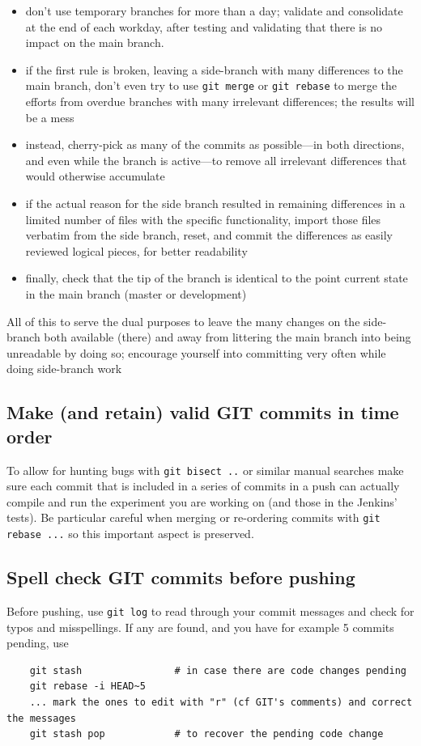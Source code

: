 \documentclass[paper=a4,fontsize=11pt]{scrartcl}
\numberwithin{equation}{section}		%
\numberwithin{figure}{section}			%
\numberwithin{table}{section}				%
\newcommand{\cmdcolor}{\color{ForestGreen}}
\newcommand{\Cmd}[1]{{\cmdcolor\texttt{#1}}}
\begin{document}
\begin{itemize}
\item don't use temporary branches for more than a day; validate and consolidate at the end of each workday, after testing and validating that there is no impact on the main branch.
\item if the first rule is broken, leaving a side-branch with many differences to the main branch, don't even try to use \Cmd{git merge} or \Cmd{git rebase} to merge the efforts from overdue branches with many irrelevant differences; the results will be a mess
\item instead, cherry-pick as many of the commits as possible---in both directions, and even while the branch is active---to remove all irrelevant differences that would otherwise accumulate
\item if the actual reason for the side branch resulted in remaining differences in a limited number of files with the specific functionality, import those files verbatim from the side branch, reset, and commit the differences as easily reviewed logical pieces, for better readability
\item finally, check that the tip of the branch is identical to the point current state in the main branch (master or development)
\end{itemize}
All of this to serve the dual purposes to leave the many changes on the side-branch both available (there) and away from littering the main branch into being unreadable
by doing so; encourage yourself into committing very often while doing side-branch work

\subsection{Make (and retain) valid GIT commits in time order}
To allow for hunting bugs with \verb|git bisect ..| or similar manual searches make sure each commit that is included in a series of commits in a push can actually compile and run the experiment you are working on (and those in the Jenkins' tests).  Be particular careful when merging or re-ordering commits with \verb|git rebase ...| so this important aspect is preserved.

\subsection{Spell check GIT commits before pushing}
Before pushing, use \Cmd{git log} to read through your commit messages and check for typos and misspellings.  If any are found, and you have for example 5 commits pending, use
{\cmdcolor\small\begin{verbatim}
    git stash                # in case there are code changes pending
    git rebase -i HEAD~5
    ... mark the ones to edit with "r" (cf GIT's comments) and correct the messages
    git stash pop            # to recover the pending code change
\end{verbatim}}
\end{document}
